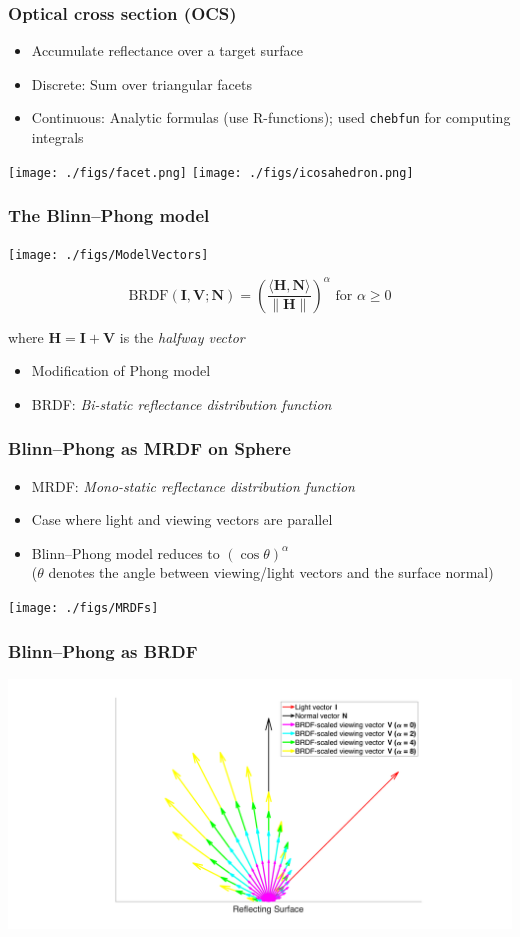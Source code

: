 \documentclass{beamer}
\begin{document}
\begin{frame}[fragile]
\frametitle{Optical cross section (OCS)}
\begin{itemize}
\item Accumulate reflectance over a target surface
\item Discrete: Sum over triangular facets 
\item Continuous: Analytic formulas (use R-functions); 
used \verb+chebfun+ for computing integrals
\end{itemize}
\centerline{\texttt{[image: ./figs/facet.png]} \: \texttt{[image: ./figs/icosahedron.png]}}
\end{frame}

\begin{frame}[t]
\frametitle{The Blinn--Phong model}
\centerline{\texttt{[image: ./figs/ModelVectors]}}
\begin{tcolorbox}
$$\text{BRDF}(\mathbf{I},\mathbf{V};\mathbf{N}) = \left(\frac{\langle\mathbf{H},\mathbf{N}\rangle}{\|\mathbf{H}\|}\right)^\alpha \text{ for } \alpha \geq 0$$
\centerline{where $\mathbf{H} = \mathbf{I} + \mathbf{V}$ is the \textit{halfway vector}}
\end{tcolorbox}
\begin{itemize}
\item Modification of Phong model
\item BRDF: \textit{Bi-static reflectance distribution function}
\end{itemize}
\end{frame}

\begin{frame}[t]
\frametitle{Blinn--Phong as MRDF on Sphere}
\begin{itemize}
\item MRDF: \textit{Mono-static reflectance distribution function}
\item Case where light and viewing vectors are parallel
\item Blinn--Phong model reduces to $(\cos\theta)^\alpha$ \\
($\theta$ denotes the angle between viewing/light vectors and the surface normal)

\vspace*{0.25 in} 
\end{itemize}
\centerline{\texttt{[image: ./figs/MRDFs]}}
\end{frame}

\begin{frame}
\frametitle{Blinn--Phong as BRDF}
\centerline{\includegraphics[scale=0.4]{./figs/BRDF_Vectors.pdf}}
\end{frame}
\end{document}
